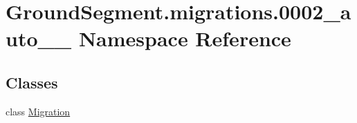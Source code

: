\hypertarget{namespace_ground_segment_1_1migrations_1_10002__auto__20161126__1037}{}\section{Ground\+Segment.\+migrations.0002\+\_\+auto\+\_\+\_ Namespace Reference}
\label{namespace_ground_segment_1_1migrations_1_10002__auto__20161126__1037}
\subsection*{Classes}
\begin{DoxyCompactItemize}
\item 
class \hyperlink{class_ground_segment_1_1migrations_1_10002__auto__20161126__1037_1_1_migration}{Migration}
\end{DoxyCompactItemize}
